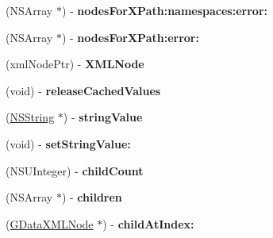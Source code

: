 \begin{DoxyCompactItemize}
\item 
\hypertarget{interface_g_data_x_m_l_node_a93c2784d84fc245d99cf2943fc41c19c}{
(NSArray $\ast$) -\/ {\bfseries nodesForXPath:namespaces:error:}}
\label{interface_g_data_x_m_l_node_a93c2784d84fc245d99cf2943fc41c19c}

\item 
\hypertarget{interface_g_data_x_m_l_node_a48f3179efdba9b7e017aa32e7118907b}{
(NSArray $\ast$) -\/ {\bfseries nodesForXPath:error:}}
\label{interface_g_data_x_m_l_node_a48f3179efdba9b7e017aa32e7118907b}

\item 
\hypertarget{interface_g_data_x_m_l_node_a775ef8bdbcb26003bfd326930f028d44}{
(xmlNodePtr) -\/ {\bfseries XMLNode}}
\label{interface_g_data_x_m_l_node_a775ef8bdbcb26003bfd326930f028d44}

\item 
\hypertarget{interface_g_data_x_m_l_node_a71cb5af09b5c6737c452f2e09bcdec36}{
(void) -\/ {\bfseries releaseCachedValues}}
\label{interface_g_data_x_m_l_node_a71cb5af09b5c6737c452f2e09bcdec36}

\item 
\hypertarget{interface_g_data_x_m_l_node_ad6cef8a7c9c6714b8ea42e2620f86866}{
(\hyperlink{class_n_s_string}{NSString} $\ast$) -\/ {\bfseries stringValue}}
\label{interface_g_data_x_m_l_node_ad6cef8a7c9c6714b8ea42e2620f86866}

\item 
\hypertarget{interface_g_data_x_m_l_node_ab3b73dcb1ac9607325552747a3055a1e}{
(void) -\/ {\bfseries setStringValue:}}
\label{interface_g_data_x_m_l_node_ab3b73dcb1ac9607325552747a3055a1e}

\item 
\hypertarget{interface_g_data_x_m_l_node_a8c1ecef5a1827105f8cdb435fe330dda}{
(NSUInteger) -\/ {\bfseries childCount}}
\label{interface_g_data_x_m_l_node_a8c1ecef5a1827105f8cdb435fe330dda}

\item 
\hypertarget{interface_g_data_x_m_l_node_a5d78f07c8cd059176801973bf6883452}{
(NSArray $\ast$) -\/ {\bfseries children}}
\label{interface_g_data_x_m_l_node_a5d78f07c8cd059176801973bf6883452}

\item 
\hypertarget{interface_g_data_x_m_l_node_acabc5e624c3bbc27ba75c443d48b9795}{
(\hyperlink{interface_g_data_x_m_l_node}{GDataXMLNode} $\ast$) -\/ {\bfseries childAtIndex:}}
\label{interface_g_data_x_m_l_node_acabc5e624c3bbc27ba75c443d48b9795}


\end{DoxyCompactItemize}
